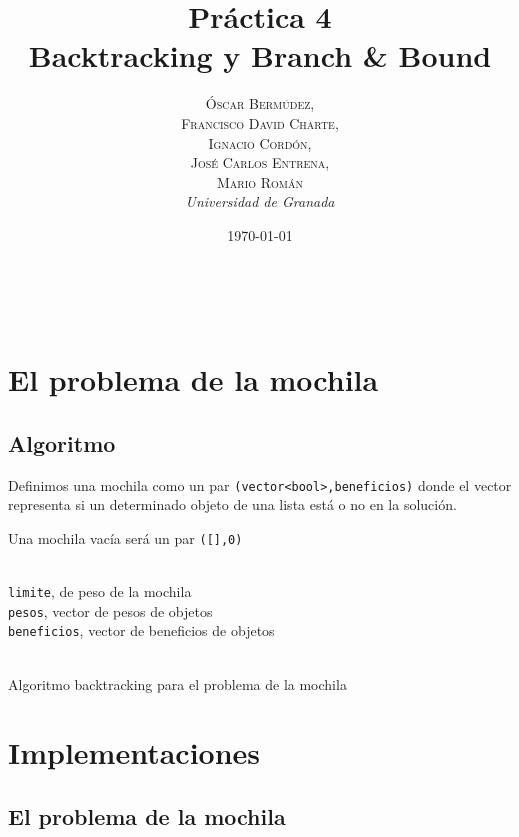 \documentclass[a4paper, 11pt]{article} %
\title{\textbf{Práctica 4}\\ %
Backtracking y Branch \& Bound} %
\author{\textsc{Óscar Bermúdez,\\Francisco David Charte,\\Ignacio Cordón,\\José Carlos Entrena,\\Mario Román} %
\\{\textit{Universidad de Granada}}} %
\date{\today} %
\makeatletter
\let\emptyset\varnothing
\renewcommand{\maketitle}{ %
\begin{flushright} %
{\LARGE\@title} %

\vspace{50pt} %

{\large\@author} %
\\\@date %

\vspace{40pt} %
\end{flushright}
}
\makeatother
\begin{document}
\maketitle %

\renewcommand{\abstractname}{Resumen} %
\begin{abstract}
\end{abstract}
{\parskip=2pt
\tableofcontents
}
\pagebreak


\section{El problema de la mochila}


\subsection{Algoritmo}

Definimos una mochila como un par \texttt{(vector<bool>,beneficios)} donde el vector
representa si un determinado objeto de una lista está o no en la solución.

Una mochila vacía será un par \texttt{([],0)}
\begin{algorithm}[H]
	\begin{algorithmic}[1]
		\REQUIRE \ \\
        	\texttt{limite}, de peso de la mochila \\
        	\texttt{pesos}, vector de pesos de objetos\\
        	\texttt{beneficios}, vector de beneficios de objetos\\\
     	
     	\WHILE{\texttt{posibles\_mochilas}$\neq \emptyset$}
	    \ENDIF
	  \ELSE
	    \ENDIF
	  \ENDIF
     	\ENDWHILE
     	
	\end{algorithmic}
    \caption{Algoritmo backtracking para el problema de la mochila}
    \label{monedas}
\end{algorithm}  

\section{Implementaciones}

\subsection{El problema de la mochila}
    
\end{document}
